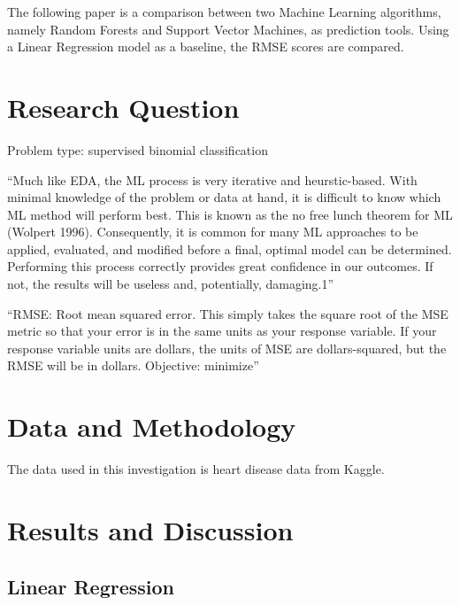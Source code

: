 \documentclass[11pt,preprint, authoryear]{elsarticle}
\numberwithin{equation}{section}
\numberwithin{figure}{section}
\numberwithin{table}{section}
\begin{document}
The following paper is a comparison between two Machine Learning
algorithms, namely Random Forests and Support Vector Machines, as
prediction tools. Using a Linear Regression model as a baseline, the
RMSE scores are compared.

\hypertarget{research-question}{%
\section{Research Question}\label{research-question}}

Problem type: supervised binomial classification

``Much like EDA, the ML process is very iterative and heurstic-based.
With minimal knowledge of the problem or data at hand, it is difficult
to know which ML method will perform best. This is known as the no free
lunch theorem for ML (Wolpert 1996). Consequently, it is common for many
ML approaches to be applied, evaluated, and modified before a final,
optimal model can be determined. Performing this process correctly
provides great confidence in our outcomes. If not, the results will be
useless and, potentially, damaging.1''

``RMSE: Root mean squared error. This simply takes the square root of
the MSE metric so that your error is in the same units as your response
variable. If your response variable units are dollars, the units of MSE
are dollars-squared, but the RMSE will be in dollars. Objective:
minimize''

\hypertarget{data-and-methodology}{%
\section{Data and Methodology}\label{data-and-methodology}}

The data used in this investigation is heart disease data from Kaggle.

\hypertarget{results-and-discussion}{%
\section{Results and Discussion}\label{results-and-discussion}}

\hypertarget{linear-regression}{%
\subsection{Linear Regression}\label{linear-regression}}
\end{document}
